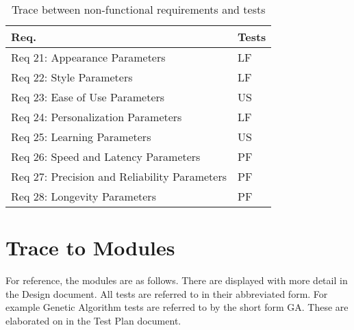 \documentclass[12pt, titlepage]{article}
\begin{document}
\begin{table}[H]
\centering
\begin{tabular}{p{} p{}}
\toprule
\textbf{Req.} & \textbf{Tests}\\
\midrule
Req 21: Appearance Parameters & LF\\
Req 22: Style Parameters & LF\\
Req 23: Ease of Use Parameters & US\\
Req 24: Personalization Parameters & LF\\
Req 25: Learning Parameters & US\\
Req 26: Speed and Latency Parameters & PF\\
Req 27: Precision and Reliability Parameters & PF\\
Req 28: Longevity Parameters & PF\\
\bottomrule
\end{tabular}
\caption{Trace between non-functional requirements and tests}
\label{TblRT2}
\end{table}

\section{Trace to Modules}	

For reference, the modules are as follows. There are displayed with more detail in the Design document. All tests are referred to in their abbreviated form. For example Genetic Algorithm tests are referred to by the short form GA. These are elaborated on in the Test Plan document.
\end{document}
